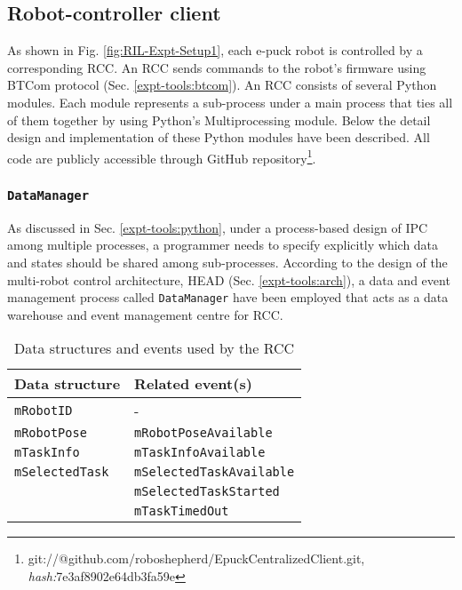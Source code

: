 \subsection{Robot-controller client}
As shown in Fig. \ref{fig:RIL-Expt-Setup1}, each e-puck robot is controlled by a corresponding RCC. An RCC sends commands to the robot's firmware using BTCom protocol  (Sec. \ref{expt-tools:btcom}).
An RCC consists of several Python modules. Each module represents a sub-process under a main process that ties all of them together by using Python's Multiprocessing module. Below  the detail design and implementation of these Python modules  have been described. All code are publicly accessible through GitHub repository\footnote{git://@github.com/roboshepherd/EpuckCentralizedClient.git,    
\textit{hash:}7e3af8902e64db3fa59e}.
\subsubsection*{\texttt{DataManager}}
As discussed in Sec. \ref{expt-tools:python}, under a process-based design of IPC among multiple processes, a programmer needs to specify explicitly which data and states should be shared among sub-processes. According to the design of the multi-robot control architecture, HEAD (Sec. \ref{expt-tools:arch}), a data and event management process called \texttt{DataManager}  have been employed that acts as a data warehouse and event management centre for RCC.\\
\begin{table}
\caption{Data structures and events used by the RCC}
\begin{center}
\begin{tabular}{|l|l|}
\hline \textbf{Data structure} & \textbf{Related event(s)}\\ 
\hline \texttt{\texttt{mRobotID}} & - \\ 
\hline \texttt{mRobotPose} & \texttt{mRobotPoseAvailable}\\ 
\hline \texttt{mTaskInfo} & \texttt{mTaskInfoAvailable}\\ 
\hline \texttt{mSelectedTask} & \texttt{mSelectedTaskAvailable}\\
 &  \texttt{mSelectedTaskStarted}\\
 &  \texttt{mTaskTimedOut}\\
 \hline 
\end{tabular}
\end{center}
\label{table:data-mgr}
\end{table} 
